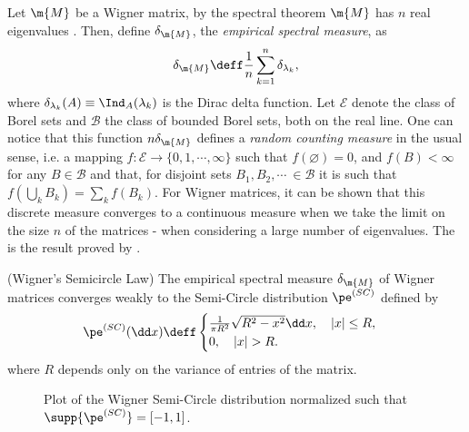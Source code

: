 Let $\m{M}$ be a Wigner matrix, by the spectral theorem $\m{M}$ has $n$ real eigenvalues . Then, define $\delta_{\m{M}}$, the \textit{empirical spectral measure}, as
\begin{equation} \label{Equation: empirical measure}
	\delta_{\m{M}} \deff \frac{1}{n} \sum_{k=1}^{n} \delta_{\lambda_k},
\end{equation}
where $\delta_{\lambda_k}(A) \equiv \Ind_A(\lambda_k)$ is the Dirac delta function.  Let $\mathcal{E}$ denote the class of Borel sets and $\mathcal{B}$ the class of bounded Borel sets, both on the real line. One can notice that this function $n \delta_{\m{M}}$ defines a \textit{random counting measure} in the usual sense, i.e. a mapping $f: \mathcal{E} \rightarrow \{0,1,\cdots, \infty\}$ such that $f(\varnothing) = 0$, and $f(B) < \infty $ for any $B \in \mathcal{B}$ and that, for disjoint sets $B_1, B_2, \cdots \ \in \mathcal{B}$ it is such that $f\left( \bigcup_k B_k \right) = \sum_k f(B_k)$. For Wigner matrices, it can be shown that this discrete measure converges to a continuous measure when we take the limit on the size $n$ of the matrices - when considering a large number of eigenvalues. The is the result proved by .

\begin{teorema} \label{Theorem: SemiCircle}(Wigner's Semicircle Law)
	The empirical spectral measure $\delta_{\m{M}}$ of Wigner matrices converges weakly to the Semi-Circle distribution $\pe^{(SC)}$ defined by
	\begin{equation}
		\pe^{(SC)}(\dd x) \deff 
		\begin{cases}
			\frac{1}{\pi R^2} \sqrt{R^2 - x^2} \dd x, \quad |x| \leq R, \\
			0,  \quad |x| > R.
		\end{cases}
	\end{equation}
	where $R$ depends only on the variance of entries of the matrix.
\end{teorema}

\begin{figure}[h!]
	\centering
	\caption{Plot of the Wigner Semi-Circle distribution normalized such that $\supp{\pe^{(SC)}} = [-1, 1]$.}
	\label{Figure: Semi-Circle RMT}
\end{figure}

